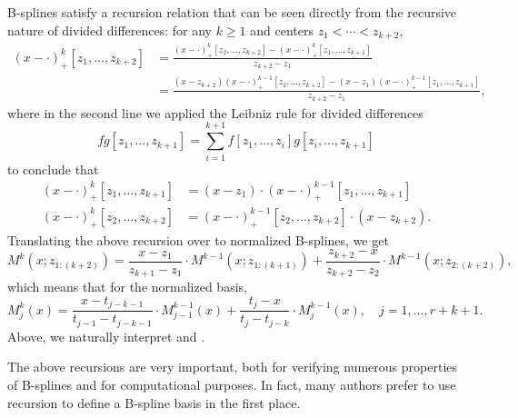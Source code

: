 \documentclass{article}
\begin{document}
B-splines satisfy a recursion relation that can be seen directly from the
recursive nature of divided differences: for any $k \geq 1$ and centers $z_1 <
\cdots < z_{k+2}$,  
\begin{align*}
(x - \cdot)^k_+ [z_1,\dots,z_{k+2}]
&= \frac{(x - \cdot)^k_+[z_2,\dots,z_{k+2}] - 
(x -\cdot)^k_+[z_1,\dots,z_{k+1}]}{z_{k+2} - z_1} \\
&= \frac{(x-z_{k+2})(x - \cdot)^{k-1}_+[z_2,\dots,z_{k+2}] 
- (x-z_1) (x - \cdot)^{k-1}_+[z_1,\dots,z_{k+1}] }{z_{k+2} - z_1},  
\end{align*} 
where in the second line we applied the Leibniz rule for divided differences 
\[
fg [z_1,\dots,z_{k+1}] = \sum_{i=1}^{k+1} f[z_1,\dots,z_i] g[z_i,\dots,z_{k+1}] 
\]
to conclude that
\begin{align*}
(x - \cdot)^k_+ [z_1,\dots,z_{k+1}] &= (x-z_1) \cdot 
(x - \cdot)^{k-1}_+ [z_1,\dots,z_{k+1}] \\
(x - \cdot)^k_+ [z_2,\dots,z_{k+2}] &= (x - \cdot)^{k-1}_+ 
  [z_2,\dots,z_{k+2}] \cdot (x-z_{k+2}). 
\end{align*}
Translating the above recursion over to normalized B-splines, we get 
\[
M^k(x; z_{1:(k+2)}) = \frac{x-z_1}{z_{k+1}-z_1} \cdot 
M^{k-1}(x; z_{1:(k+1)}) + \frac{z_{k+2}-x}{z_{k+2}-z_2} \cdot 
M^{k-1}(x; z_{2:(k+2)}),  
\]
which means that for the normalized basis, 
\[
M^k_j(x) = \frac{x-t_{j-k-1}}{t_{j-1}-t_{j-k-1}} \cdot
M^{k-1}_{j-1}(x) + \frac{t_j-x}{t_j-t_{j-k}} \cdot M^{k-1}_j(x), 
\quad j=1,\dots,r+k+1.  
\]
Above, we naturally interpret  and . 

The above recursions are very important, both for verifying numerous properties
of B-splines and for computational purposes. In fact, many authors prefer to
use recursion to define a B-spline basis in the first place.
\end{document}
